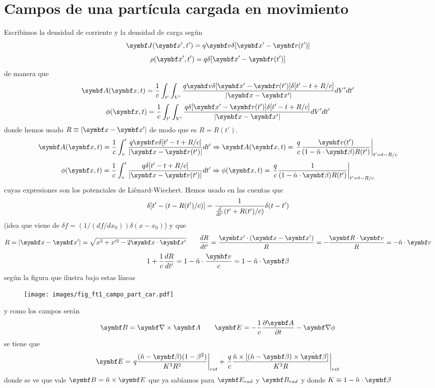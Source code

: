 \documentclass[10pt,oneside]{CBFT_book}
\begin{document}
\section{Campos de una partícula cargada en movimiento}

Escribimos la densidad de corriente y la densidad de carga según
\[
	\vb{J}(\vb{x}',t') = q\vb{v} \delta[ \vb{x}' - \vb{r}(t')]
\]
\[
	\rho(\vb{x}',t') = q \delta[ \vb{x}' - \vb{r}(t')]
\]
de manera que 
\[
	\vb{A}(\vb{x},t) = \frac{1}{c} \int_{t'}\int_{V'} 
	\frac{ q\vb{v} \delta[ \vb{x}' - \vb{r}(t')] \delta[ t'-t +R/c] }{|\vb{x} -\vb{x}'|} dV' dt'
\]
\[
	\phi(\vb{x},t) = \frac{1}{c} \int_{t'}\int_{V'} 
	\frac{ q \delta[ \vb{x}' - \vb{r}(t')] \delta[ t'-t +R/c] }{|\vb{x} -\vb{x}'|} dV' dt'
\]
donde hemos usado $R\equiv |\vb{x}-\vb{x}'|$ de modo que es $R = R(t')$.
\[
	\vb{A}(\vb{x},t) = \frac{1}{c} \int_v' \frac{ q\vb{v} \delta[ t'-t +R/c] }{|\vb{x} -\vb{r}(t')|} dt' 
	\Rightarrow \vb{A}(\vb{x},t) = \left. \frac{q}{c} \frac{\vb{v}(t')}
	{(1-\hat{n}\cdot{\vb{\beta}})R(t')} \right|_{t'=t-R/c}
\]
\[
	\phi(\vb{x},t) = \frac{1}{c} \int_v' \frac{q \delta[ t'-t +R/c]}{|\vb{x} -\vb{r}(t')|} dt' 
	\Rightarrow \phi(\vb{x},t) = \left. \frac{q}{c} \frac{1}{(1-\hat{n}\cdot{\vb{\beta}})R(t')} 
	\right|_{t'=t-R/c}
\]
cuyas expresiones son los potenciales de Liènard-Wiechert. Hemos usado en las cuentas que 
\[
	\delta[t' - ( t - R(t')/c )] = \frac{1}{\frac{d^{\hspace{-0.05em}} {}}{d {t'}^{\hspace{-0.05em}}}( t' + R(t')/c )} \delta( t-t')
\]
(idea que viene de $\delta f = (1/(df/dx_0)) \delta(x-x_0) $) y que 
\[
	R = |\vb{x}-\vb{x}'| = \sqrt{ x^2 + x'^2 - 2\pe{x}{x'} } \qquad \dtot{R}{t'} = 
	\frac{\dot{\vb{x}'}\cdot(\vb{x}-\vb{x}')}{R} = -\frac{\pe{R}{v}}{R} = -\hat{n}\cdot\vb{v}
\]
\[
	1 + \frac{1}{c} \dtot{R}{t'}  = 1 -\hat{n}\cdot\frac{\vb{v}}{c} = 1 - \hat{n}\cdot\vb{\beta}
\]
según la figura que ilustra bajo estas líneas

\begin{figure}[htb]
	\begin{center}
	\texttt{[image: images/fig\_ft1\_campo\_part\_car.pdf]}	 
	\end{center}
	\caption{}
\end{figure} 

y como los campos serán 
\[
	\vb{B} = \rotorm{A} \qquad \vb{E} = -\frac{1}{c}\dpar{\vb{A}}{t} - \Nabla\phi
\]
se tiene que 
\[
	\vb{E} = \left. q \frac{ (\hat{n}-\vb{\beta})(1-\beta^2)}{K^3R^2} \right|_{ret} + \left. 
	\frac{q}{c} \frac{\hat{n}\times[ (\hat{n}-\vb{\beta})\times \dot{\vb{\beta}} ]}{K^3R} \right|_{ret}
\]
donde se ve que vale $\vb{B} = \hat{n} \times \vb{E}$ que ya sabíamos para $\vb{E}_{rad}$ y $\vb{B}_{rad}$
y donde $K\equiv 1 - \hat{n}\cdot\vb{\beta} $
\end{document}
